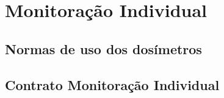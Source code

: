 \chapter{Monitoração Individual}
\label{ch:monitoracao_individual}

\section{Normas de uso dos dosímetros}

\section{Contrato Monitoração Individual}
\label{sec:contrato_monitorcao-individual}
